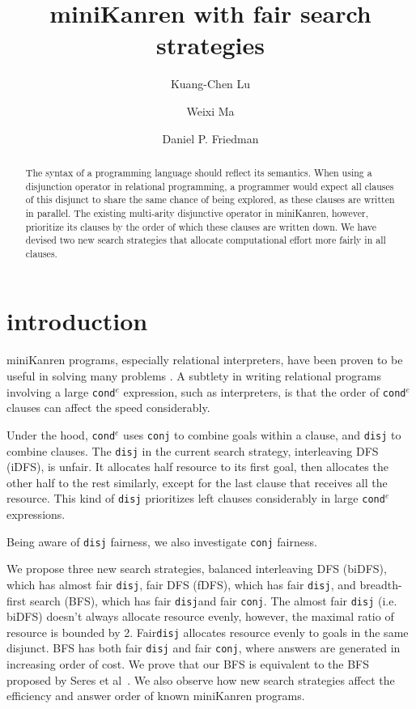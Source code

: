 \documentclass[format=acmlarge, review=true, authordraft=true]{acmart}
\title{miniKanren with fair search strategies}
\author{Kuang-Chen Lu}
\affiliation{Indiana University}
\author{Weixi Ma}
\affiliation{Indiana University}
\author{Daniel P. Friedman}
\affiliation{Indiana University}
\newcommand{\conde}{\texttt{cond$^e$} }
\newcommand{\conj}{\texttt{conj}}
\newcommand{\disj}{\texttt{disj}}
\begin{document}
\begin{abstract}

The syntax of a programming language should reflect its semantics. When using a
disjunction operator in relational programming, a programmer would expect all
clauses of this disjunct to share the same chance of being explored, as
these clauses are written in parallel. The existing multi-arity disjunctive
operator in miniKanren, however, prioritize its clauses by the order of which
these clauses are written down. We have devised two new search strategies that
allocate computational effort more fairly in all clauses.

\end{abstract}

\maketitle

\section{introduction}

miniKanren programs, especially relational interpreters, have been proven to be useful in solving many problems \citep{byrd2017unified}. A subtlety in writing relational programs involving a large \conde expression, such as interpreters, is that the order of \conde clauses can affect the speed considerably.

Under the hood, \conde uses \texttt{conj} to combine goals within a clause, and \texttt{disj} to combine clauses. The \texttt{disj} in the current search strategy, interleaving DFS (iDFS), is unfair. It allocates half resource to its first goal, then allocates the other half to the rest similarly, except for the last clause that receives all the resource. This kind of \texttt{disj} prioritizes left clauses considerably in large \conde expressions.

Being aware of \texttt{disj} fairness, we also investigate \texttt{conj} fairness. 

We propose three new search strategies, balanced interleaving DFS (biDFS), which has almost fair \disj, fair DFS (fDFS), which has fair \disj, and breadth-first search (BFS), which has fair \disj and fair \conj. The almost fair \texttt{disj} (i.e. biDFS) doesn't always allocate resource evenly, however, the maximal ratio of resource is bounded by 2. Fair\texttt{disj} allocates resource evenly to goals in the same disjunct. BFS has both fair \texttt{disj} and fair \texttt{conj}, where answers are generated in increasing order of cost. We prove that our BFS is equivalent to the BFS proposed by Seres et al~\citep{seres1999algebra}. We also observe how new search strategies affect the efficiency and answer order of known miniKanren programs.
\end{document}
